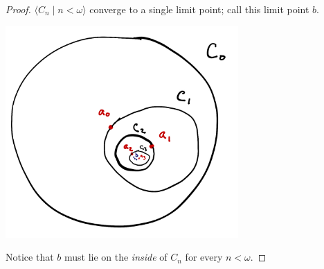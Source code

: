 \documentclass[a4paper]{memoir}
\theoremstyle{definition}
\begin{document}
\begin{proof}
  $\langle C_n \mid n < \omega \rangle$ converge to a single limit point; call this limit point 
  $b$.
  \begin{center}
    \includegraphics[width=3.5in]{nesting-limit}
  \end{center}
  Notice that $b$ must lie on the \emph{inside} of $C_n$ for every $n < \omega$. 
  

\end{proof}
\end{document}
